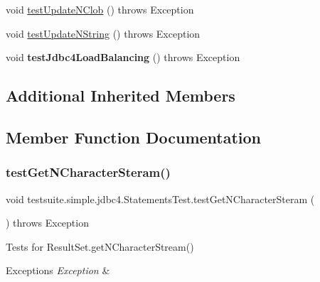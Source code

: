 \begin{DoxyCompactItemize}
\item 
void \mbox{\hyperlink{classtestsuite_1_1simple_1_1jdbc4_1_1_statements_test_a0531d25ccf1c48af2552727cc856d02e}{test\+Update\+N\+Clob}} ()  throws Exception 
\item 
void \mbox{\hyperlink{classtestsuite_1_1simple_1_1jdbc4_1_1_statements_test_aa722a960ad8bab6d0200194d2d4f7e94}{test\+Update\+N\+String}} ()  throws Exception 
\item 
\mbox{\label{classtestsuite_1_1simple_1_1jdbc4_1_1_statements_test_a0e5d0202749ccc4025147cd67ce633c3}} 
void {\bfseries test\+Jdbc4\+Load\+Balancing} ()  throws Exception 
\end{DoxyCompactItemize}
\subsection*{Additional Inherited Members}


\subsection{Member Function Documentation}
\mbox{\label{classtestsuite_1_1simple_1_1jdbc4_1_1_statements_test_a3f8a03b3e0f6b2b37f81692a35fa407e}} 
\subsubsection{\texorpdfstring{test\+Get\+N\+Character\+Steram()}{testGetNCharacterSteram()}}
{\footnotesize\ttfamily void testsuite.\+simple.\+jdbc4.\+Statements\+Test.\+test\+Get\+N\+Character\+Steram (\begin{DoxyParamCaption}{ }\end{DoxyParamCaption}) throws Exception}

Tests for Result\+Set.\+get\+N\+Character\+Stream()


\begin{DoxyExceptions}{Exceptions}
{\em Exception} & \\
\hline
\end{DoxyExceptions}
\mbox{\label{classtestsuite_1_1simple_1_1jdbc4_1_1_statements_test_ab65294c85bd8e5cb6609737cded4d1f4}} 
